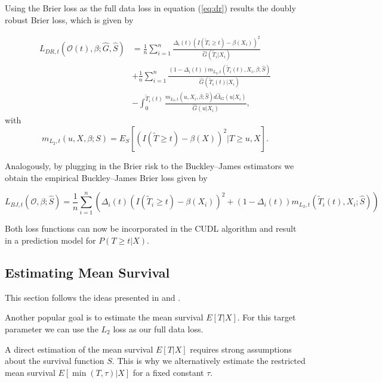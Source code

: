 \documentclass[12pt, a4paper]{scrartcl}
\theoremstyle{definition}
\theoremstyle{plain}
\numberwithin{equation}{section}
\numberwithin{figure}{section}
\numberwithin{table}{section}
\begin{document}
	Using the Brier loss as the full data loss in equation (\ref{eq:dr}) results the doubly robust Brier loss, which is given by
	
	\begin{equation*}
	\begin{split}
		L_{DR, t}(\mathcal{O}(t),\beta; \hat{G},\hat{S}) &=  \frac{1}{n} \sum_{i=1}^n \frac{\Delta_i(t)(I(\tilde{T}_i \geq t)-\beta(X_i))^2}{\hat{G}(\tilde{T}_i \vert X_i)}\\
		& + \frac{1}{n} \sum_{i=1}^n \frac{(1-\Delta_i(t))m_{L_2,t}(\tilde{T}_i(t),X_i,\beta; \hat{S})}{\hat{G}(\tilde{T}_i(t) \vert X_i)}\\
		& - \int_{0}^{\tilde{T}_i(t)} \frac{m_{L_2,t}(u,X_i,\beta; \hat{S})d\hat{\Lambda}_G(u\vert X_i)}{\hat{G}(u \vert X_i)},
	\end{split}
	\end{equation*}
	 with
	 \begin{equation*}
	 	m_{L_2,t}(u,X,\beta;S) = E_S[(I(\tilde{T}\geq t)-\beta(X))^2 \vert T \geq u, X].
	 \end{equation*}
	
	Analogously, by plugging in the Brier risk to the Buckley--James estimators we obtain the empirical Buckley--James Brier loss given by
	
	\begin{equation*}
		L_{BJ,t}(\mathcal{O},\beta; \hat{S}) = \frac{1}{n} \sum_{i=1}^n \left( \Delta_i(t)(I(\tilde{T}_i\geq t)-\beta(X_i))^2 + (1- \Delta_i(t))m_{L_2,t}(\tilde{T}_i(t), X_i; \hat{S})\right)
	\end{equation*}
	
	Both loss functions can now be incorporated in the CUDL algorithm and result in a prediction model for $P(T\geq t\vert X)$.

	\subsection{Estimating Mean Survival}
	
	This section follows the ideas presented in \citet*{basearticle} and \citet*{strawderman}.
	
	Another popular goal is to estimate the mean survival $E[T\vert X]$.
	For this target parameter we can use the $L_2$ loss as our full data loss.
	
	A direct estimation of the mean survival $E[T\vert X]$ requires strong assumptions about the survival function $S$.
	This is why we alternatively estimate the restricted mean survival $E[\min(T, \tau)\vert X]$ for a fixed constant $\tau$.
	
\end{document}
